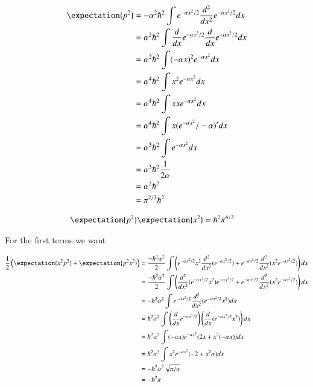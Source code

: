 \begin{align*}
\expectation{p^2} 
&= -\alpha^2 \hbar^2 \int e^{-\alpha x^2/2} \frac{d^2}{dx^2} e^{-\alpha x^2/2} dx \\
&= \alpha^2 \hbar^2 \int \frac{d}{dx} e^{-\alpha x^2/2} \frac{d}{dx} e^{-\alpha x^2/2} dx \\
&= \alpha^2 \hbar^2 \int (-\alpha x)^2 e^{-\alpha x^2} dx \\
&= \alpha^4 \hbar^2 \int x^2 e^{-\alpha x^2} dx \\
&= \alpha^4 \hbar^2 \int x x e^{-\alpha x^2} dx \\
&= \alpha^4 \hbar^2 \int x (e^{-\alpha x^2}/-\alpha)' dx \\
&= \alpha^3 \hbar^2 \int e^{-\alpha x^2} dx \\
&= \alpha^3 \hbar^2 \inv{2\alpha} \\
&= \alpha^2 \hbar^2  \\
&= \pi^{2/3} \hbar^2 
\end{align*}

\begin{align*}
\expectation{p^2} \expectation{x^2} &= \hbar^2 \pi^{4/3}
\end{align*}

For the first terms we want

\begin{align*}
\inv{2} \left( \expectation{x^2 p^2} + \expectation{p^2 x^2} \right)
&=
\frac{-\hbar^2 \alpha^2}{2} \int \left( 
e^{-\alpha x^2/2} x^2 \frac{d^2}{dx^2} (e^{-\alpha x^2/2} )
+ e^{-\alpha x^2/2} \frac{d^2}{dx^2} ( x^2 e^{-\alpha x^2/2} ) \right) dx \\
&=
\frac{-\hbar^2 \alpha^2}{2} \int \left( 
 \frac{d^2}{dx^2} ( e^{-\alpha x^2/2} x^2 ) e^{-\alpha x^2/2} 
+ e^{-\alpha x^2/2} \frac{d^2}{dx^2} ( x^2 e^{-\alpha x^2/2} ) \right) dx \\
&=
{-\hbar^2 \alpha^2} \int e^{-\alpha x^2/2} \frac{d^2}{dx^2} ( e^{-\alpha x^2/2} x^2 ) dx \\
&=
{\hbar^2 \alpha^2} \int \left( \frac{d}{dx} e^{-\alpha x^2/2} \right) \left( \frac{d}{dx} ( e^{-\alpha x^2/2} x^2 ) \right) dx \\
&=
{\hbar^2 \alpha^2} \int (-\alpha x) e^{-\alpha x^2} (2x + x^2(-\alpha x)) dx \\
&=
{\hbar^2 \alpha^3} \int x^2 e^{-\alpha x^2} (-2 + x^2 \alpha ) dx \\
&=
{-\hbar^2 \alpha^2} \sqrt{\pi/\alpha}  \\
&=
-\hbar^2 \pi
\end{align*}

